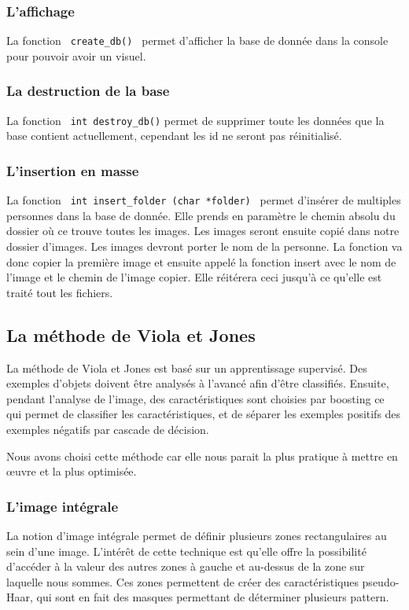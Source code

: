 \documentclass[12pt,a4paper]{article}
\begin{document}
\subsubsection{L'affichage}
La fonction \verb| create_db() | permet d'afficher la base de donnée dans la console pour pouvoir avoir un visuel.
\subsubsection{La destruction de la base}
La fonction \verb| int destroy_db()| permet de supprimer toute les données que la base contient actuellement, cependant les id ne seront pas réinitialisé.
\subsubsection{L'insertion en masse}
La fonction \verb| int insert_folder (char *folder) | permet d'insérer de multiples personnes dans la base de donnée. Elle prends en paramètre le chemin absolu du dossier où ce trouve toutes les images. Les images seront ensuite copié dans notre dossier d'images. Les images devront porter le nom de la personne. La fonction va donc copier la première image et ensuite appelé la fonction insert avec le nom de l'image et le chemin de l'image copier. Elle réitérera ceci jusqu'à ce qu'elle est traité tout les fichiers.


\newpage
\subsection{La méthode de Viola et Jones}
La méthode de Viola et Jones est basé sur un apprentissage supervisé. Des exemples d'objets doivent être analysés à l'avancé afin d'être classifiés. Ensuite, pendant l'analyse de l'image, des caractéristiques sont choisies par boosting ce qui permet de classifier les caractéristiques, et de séparer les exemples positifs des exemples négatifs par cascade de décision.

Nous avons choisi cette méthode car elle nous parait la plus pratique à mettre en œuvre et la plus optimisée.

\subsubsection{L'image intégrale}
La notion d'image intégrale permet de définir plusieurs zones rectangulaires au sein d'une image. L'intérêt de cette technique est qu'elle offre la possibilité d'accéder à la valeur des autres zones à gauche et au-dessus de la zone sur laquelle nous sommes. Ces zones permettent de créer des caractéristiques pseudo-Haar, qui sont en fait des masques permettant de déterminer plusieurs pattern. 
\end{document}
